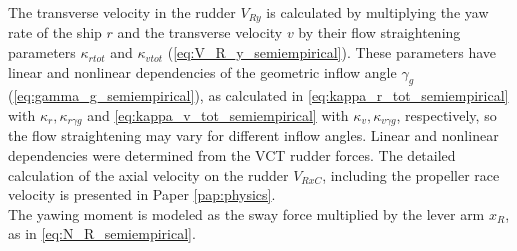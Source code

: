 The transverse velocity in the rudder $V_{Ry}$ is calculated by multiplying the yaw rate of the ship $r$ and the transverse velocity $v$ by their flow straightening parameters $\kappa_{rtot}$ and $\kappa_{vtot}$ (\autoref{eq:V_R_y_semiempirical}). These parameters have linear and nonlinear dependencies of the geometric inflow angle $\gamma_g$ (\autoref{eq:gamma_g_semiempirical}), as calculated in \autoref{eq:kappa_r_tot_semiempirical} with $\kappa_r,\kappa_{r \gamma g}$ and \autoref{eq:kappa_v_tot_semiempirical} with $\kappa_v,\kappa_{v \gamma g}$, respectively, so the flow straightening may vary for different inflow angles. Linear and nonlinear dependencies were determined from the VCT rudder forces.
The detailed calculation of the axial velocity on the rudder $V_{RxC}$, including the propeller race velocity is presented in Paper \ref{pap:physics}.
\begin{equation}
    \label{eq:V_R_y_semiempirical}
    
\end{equation}
%
\begin{equation}
    \label{eq:kappa_r_tot_semiempirical}
    
\end{equation}
%
\begin{equation}
    \label{eq:kappa_v_tot_semiempirical}
    
\end{equation}
%
\begin{equation}
    \label{eq:gamma_g_semiempirical}
    
\end{equation}
The yawing moment is modeled as the sway force multiplied by the lever arm $x_R$, as in \autoref{eq:N_R_semiempirical}.
\begin{equation}
    \label{eq:N_R_semiempirical}
    
\end{equation}
%
%
